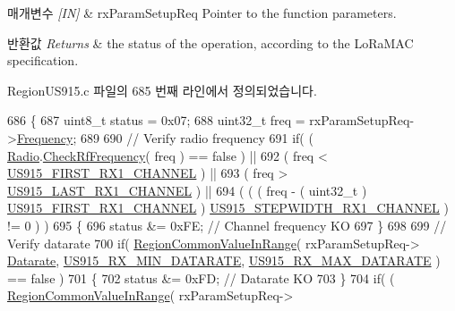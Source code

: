 \begin{DoxyParams}{매개변수}
{\em \mbox{[}\+I\+N\mbox{]}} & rx\+Param\+Setup\+Req Pointer to the function parameters.\\
\hline
\end{DoxyParams}

\begin{DoxyRetVals}{반환값}
{\em Returns} & the status of the operation, according to the Lo\+Ra\+M\+AC specification. \\
\hline
\end{DoxyRetVals}


Region\+U\+S915.\+c 파일의 685 번째 라인에서 정의되었습니다.


\begin{DoxyCode}
686 \{
687     uint8\_t status = 0x07;
688     uint32\_t freq = rxParamSetupReq->\mbox{\hyperlink{structs_rx_param_setup_req_params_ade3d190636488dad9a89b19446b7acf1}{Frequency}};
689 
690     \textcolor{comment}{// Verify radio frequency}
691     \textcolor{keywordflow}{if}( ( \mbox{\hyperlink{sx1276mb1las_8c_acf9fe61a72c16fa29a0dc449d23e3820}{Radio}}.\mbox{\hyperlink{struct_radio__s_a984f224d5ef26fb8a35f77d664f384df}{CheckRfFrequency}}( freq ) == false ) ||
692         ( freq < \mbox{\hyperlink{group___r_e_g_i_o_n_u_s915_ga8960a091cbb30429c6b69d4d528930d6}{US915\_FIRST\_RX1\_CHANNEL}} ) ||
693         ( freq > \mbox{\hyperlink{group___r_e_g_i_o_n_u_s915_ga705af2829d7167acf3900be2b3c76dbb}{US915\_LAST\_RX1\_CHANNEL}} ) ||
694         ( ( ( freq - ( uint32\_t ) \mbox{\hyperlink{group___r_e_g_i_o_n_u_s915_ga8960a091cbb30429c6b69d4d528930d6}{US915\_FIRST\_RX1\_CHANNEL}} ) %
      \mbox{\hyperlink{group___r_e_g_i_o_n_u_s915_ga3840fba7fb88e029a0679cbc320552bf}{US915\_STEPWIDTH\_RX1\_CHANNEL}} ) != 0 ) )
695     \{
696         status &= 0xFE; \textcolor{comment}{// Channel frequency KO}
697     \}
698 
699     \textcolor{comment}{// Verify datarate}
700     \textcolor{keywordflow}{if}( \mbox{\hyperlink{group___r_e_g_i_o_n_c_o_m_m_o_n_gafdd1c80d953e18d755a631b72a9c3bd3}{RegionCommonValueInRange}}( rxParamSetupReq->
      \mbox{\hyperlink{structs_rx_param_setup_req_params_ae2f6080f3aa0e9485c55513ca56bb24d}{Datarate}}, \mbox{\hyperlink{group___r_e_g_i_o_n_u_s915_ga44b4b0c33d7fbd6190937e2608b8ae71}{US915\_RX\_MIN\_DATARATE}}, 
      \mbox{\hyperlink{group___r_e_g_i_o_n_u_s915_ga01e1ec534d6632367f457fac9488a1a2}{US915\_RX\_MAX\_DATARATE}} ) == false )
701     \{
702         status &= 0xFD; \textcolor{comment}{// Datarate KO}
703     \}
704     \textcolor{keywordflow}{if}( ( \mbox{\hyperlink{group___r_e_g_i_o_n_c_o_m_m_o_n_gafdd1c80d953e18d755a631b72a9c3bd3}{RegionCommonValueInRange}}( rxParamSetupReq->

\end{DoxyCode}
